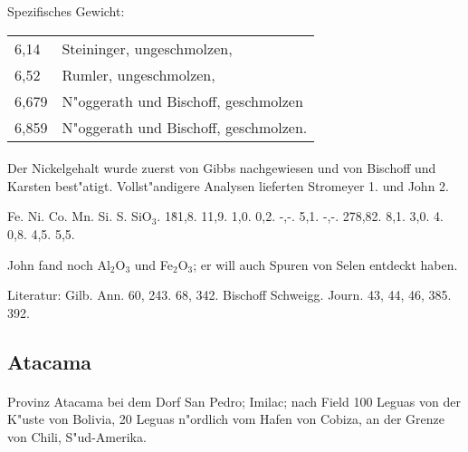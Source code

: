 \documentclass[a4paper, 11pt, oneside]{article}
\begin{document}
Spezifisches Gewicht:  
\begin{table}[!ht]
    \centering
    \begin{tabular}{l l}
        6,14 & Steininger, ungeschmolzen,\\
        6,52 & Rumler, ungeschmolzen,\\
        6,679 & N"oggerath und Bischoff, geschmolzen\\
        6,859 & N"oggerath und Bischoff, geschmolzen.
    \end{tabular}
\end{table}
\paragraph{}
Der Nickelgehalt wurde zuerst von Gibbs nachgewiesen und von Bischoff und Karsten best"atigt. Vollst"andigere Analysen lieferten Stromeyer 1. und John 2.

Fe. Ni. Co. Mn. Si. S. SiO$_{3}$.  
1\. 81,8. 11,9. 1,0. 0,2. -,-. 5,1. -,-.  
2\. 78,82. 8,1. 3,0. 4. 0,8. 4,5. 5,5.

John fand noch Al$_{2}$O$_{3}$ und Fe$_{2}$O$_{3}$; er will auch Spuren von Selen entdeckt haben.

Literatur: Gilb. Ann. 60, 243. 68, 342. Bischoff Schweigg. Journ. 43, 44, 46, 385. 392.

\subsection{Atacama}
\normalsize
\paragraph{}
Provinz Atacama bei dem Dorf San Pedro; Imilac; nach Field 100 Leguas von der K"uste von Bolivia, 20 Leguas n"ordlich vom Hafen von Cobiza, an der Grenze von Chili, S"ud-Amerika.
\end{document}

